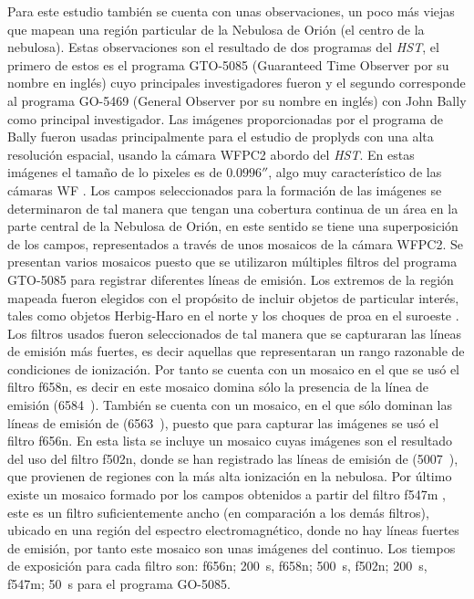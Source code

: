 Para este estudio también se cuenta con unas observaciones, un poco más viejas que mapean una región particular de la Nebulosa de Orión (el centro de la nebulosa). Estas observaciones son el resultado de dos programas del \textit{HST}, el primero de estos es el programa GTO-5085 (Guaranteed Time Observer  por su nombre en inglés) cuyo principales investigadores fueron  \citet{Odell:1996} y el segundo corresponde al programa GO-5469 (General Observer por su nombre en inglés) con John Bally como principal investigador. Las imágenes proporcionadas por el programa de Bally fueron usadas principalmente para el estudio de proplyds con una  alta resolución espacial, usando la cámara WFPC2 abordo del \textit{HST}. En estas imágenes el tamaño de lo pixeles es de \(0.0996''\), algo muy característico de las cámaras WF \citep{Holtzman:1995}. Los campos seleccionados para la formación de las imágenes se determinaron de tal manera que tengan una cobertura continua de un área en la parte central de la Nebulosa de Orión, en este sentido se tiene una superposición de los campos, representados a través de unos  mosaicos de la cámara WFPC2. Se presentan varios mosaicos puesto que se utilizaron múltiples filtros del programa GTO-5085 para registrar diferentes líneas de emisión. Los extremos de la región mapeada fueron elegidos con el propósito de incluir objetos de particular interés, tales como objetos Herbig-Haro en el norte y los choques de proa en el suroeste \citep{Odell:1996}.\\

 Los filtros usados fueron seleccionados de tal manera que se capturaran las líneas de emisión más fuertes, es decir aquellas que representaran un rango razonable de condiciones de ionización. Por tanto se cuenta con un mosaico en el que se usó el filtro f658n, es decir en este mosaico domina sólo la presencia de la línea de emisión \nii{} (6584~\A{}). También se cuenta con un mosaico, en el que sólo dominan las líneas de emisión de \ha{} (6563~\A{}), puesto que para capturar las imágenes se usó el filtro f656n. En esta lista se incluye un mosaico cuyas imágenes son el resultado del uso del filtro f502n, donde se han registrado las líneas de emisión de \oiii{} (5007~\A{}), que provienen de regiones con la más alta ionización en la nebulosa. Por último existe un mosaico formado por los campos obtenidos a partir del filtro f547m \citep{Burrows:1995}, este es un filtro suficientemente ancho (en comparación a los demás filtros), ubicado en una región del espectro electromagnético, donde no hay líneas fuertes de emisión, por tanto este mosaico son unas imágenes del continuo. Los tiempos de exposición para cada filtro son: f656n;  200~s, f658n; 500~s, f502n; 200~s, f547m; 50~s para el programa GO-5085. 



% 

% 
